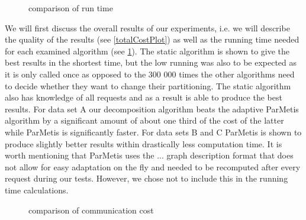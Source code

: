 \documentclass[a4paper,xcolor=dvipsnames, tikz, 12pt]{article}
\newcommand{\nl}{\newline}
\theoremstyle{definition}
\begin{document}
\begin{figure}
	\caption{comparison of run time}\label{runTimePlot}
\end{figure}

We will first discuss the overall results of our experiments, i.e. we will describe the quality of the results (see \cref{totalCostPlot}) as well as the running time needed for each examined algorithm (see \cref{runTimePlot}).\nl
The static algorithm is shown to give the best results in the shortest time, but the low running was also to be expected as it is only called once as opposed to the 300 000 times the other algorithms need to decide whether they want to change their partitioning. The static algorithm also has knowledge of all requests and as a result is able to produce the best results. \nl
For data set A our decomposition algorithm beats the adaptive ParMetis algorithm by a significant amount of about one third of the cost of the latter while ParMetis is significantly faster. For data sets B and C ParMetis is shown to produce slightly better results within drastically less computation time. It is worth mentioning that ParMetis uses the ... graph description format that does not allow for easy adaptation on the fly and needed to be recomputed after every request during our tests. However, we chose not to include this in the running time calculations.\nl

\begin{figure}
	\caption{comparison of communication cost}\label{commCostPlot}
\end{figure}
\end{document}
